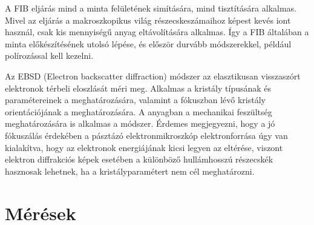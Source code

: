 \documentclass[pdftex,12pt,a4paper]{article}
\begin{document}
		A FIB eljárás mind a minta felületének simítására, mind tisztítására alkalmas. Mivel az eljárás a makroszkopikus világ részecskeszámaihoz képest kevés iont használ, csak kis mennyiségű anyag eltávolítására alkalmas. Így a FIB általában a minta előkészítésének utolsó lépése, és először durvább módszerekkel, például polírozással kell kezelni.
		
		Az EBSD (Electron backscatter diffraction) módszer az elasztikusan visszaszórt elektronok térbeli eloszlását méri meg.  Alkalmas a kristály típusának és paramétereinek a meghatározására, valamint a fókuszban lévő kristály orientációjának a meghatározására. A anyagban a mechanikai feszültség meghatározására is alkalmas a módszer. Érdemes megjegyezni, hogy a jó fókuszálás érdekében a pásztázó elektronmikroszkóp elektronforrása úgy van kialakítva, hogy az elektronok energiájának kicsi legyen az eltérése, viszont elektron diffrakciós képek esetében a különböző hullámhosszú részecskék hasznosak lehetnek, ha a kristályparamétert nem cél meghatározni.
	\section{Mérések}
\end{document}
